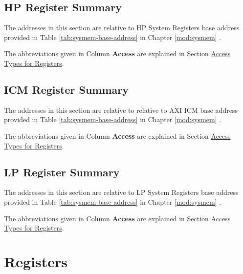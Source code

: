 \documentclass[main\_\_EN.tex]{subfiles}
\begin{document}
\subsection{HP Register Summary}

The addresses in this section are relative to HP System Registers base address provided in Table \ref{tab:sysmem-base-address} in Chapter \ref{mod:sysmem} \textit{}.

The abbreviations given in Column \textbf{Access} are explained in Section \hyperref[glossary-access-types]{Access Types for Registers}.




\subsection{ICM Register Summary}
The addresses in this section are relative to relative to AXI ICM base address provided in Table \ref{tab:sysmem-base-address} in Chapter \ref{mod:sysmem} \textit{}.

The abbreviations given in Column \textbf{Access} are explained in Section \hyperref[glossary-access-types]{Access Types for Registers}.




\subsection{LP Register Summary}

The addresses in this section are relative to LP System Registers base address provided in Table \ref{tab:sysmem-base-address} in Chapter \ref{mod:sysmem} \textit{}.

The abbreviations given in Column \textbf{Access} are explained in Section \hyperref[glossary-access-types]{Access Types for Registers}.






\newpage
\section{Registers}
\end{document}
